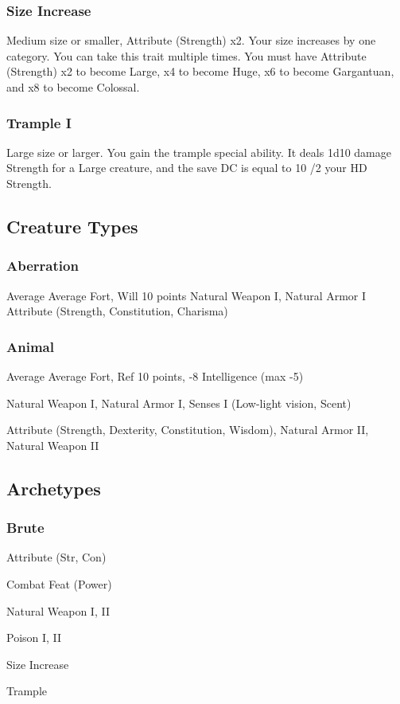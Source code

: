 \subsubsection{Size Increase}
\featpre Medium size or smaller, Attribute (Strength) x2.
\featben Your size increases by one category.
 You can take this trait multiple times. You must have Attribute (Strength) x2 to become Large, x4 to become Huge, x6 to become Gargantuan, and x8 to become Colossal.

\subsubsection{Trample I}
\featpre Large size or larger.
\featben You gain the trample special ability. It deals 1d10 damage \add Strength for a Large creature, and the save DC is equal to 10 /2 your HD \add Strength.

\subsection{Creature Types}

\subsubsection{Aberration}
\tbab Average
\tsaves Average Fort, Will
 10 points
 Natural Weapon I, Natural Armor I
 Attribute (Strength, Constitution, Charisma)

\subsubsection{Animal}
\tbab Average
\tsaves Average Fort, Ref
 10 points, -8 Intelligence (max -5)

 Natural Weapon I, Natural Armor I, Senses I (Low-light vision, Scent)

 Attribute (Strength, Dexterity, Constitution, Wisdom), Natural Armor II, Natural Weapon II

\subsection{Archetypes}

\subsubsection{Brute}
\begin{itemize*}
    \item Attribute (Str, Con)
    \item Combat Feat (Power)
    \item Natural Weapon I, II
    \item Poison I, II
    \item Size Increase
    \item Trample
\end{itemize*}

